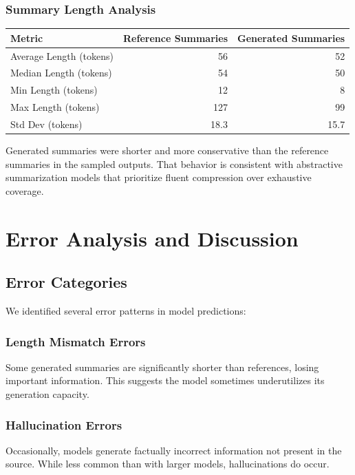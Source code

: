 \documentclass[12pt,a4paper,oneside]{report}
\begin{document}
\subsection{Summary Length Analysis}
\begin{table}[H]
\centering
\begin{tabular}{lrr}
\toprule
\textbf{Metric} & \textbf{Reference Summaries} & \textbf{Generated Summaries} \\
\midrule
Average Length (tokens) & 56 & 52 \\
Median Length (tokens) & 54 & 50 \\
Min Length (tokens) & 12 & 8 \\
Max Length (tokens) & 127 & 99 \\
Std Dev (tokens) & 18.3 & 15.7 \\
\bottomrule
\end{tabular}
\end{table}

Generated summaries were shorter and more conservative than the reference summaries in the sampled outputs. That behavior is consistent with abstractive summarization models that prioritize fluent compression over exhaustive coverage.

\chapter{Error Analysis and Discussion}
\label{ch:analysis}

\section{Error Categories}
We identified several error patterns in model predictions:

\subsection{Length Mismatch Errors}
Some generated summaries are significantly shorter than references, losing important information. This suggests the model sometimes underutilizes its generation capacity.

\subsection{Hallucination Errors}
Occasionally, models generate factually incorrect information not present in the source. While less common than with larger models, hallucinations do occur.
\end{document}
